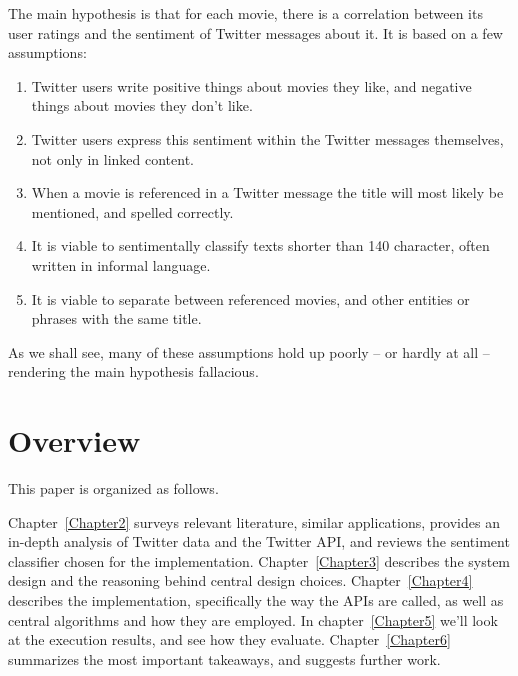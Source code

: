 The main hypothesis is that for each movie, there is a correlation between its user ratings and the sentiment of Twitter messages about it. It is based on a few assumptions:

\begin{enumerate}
  \item Twitter users write positive things about movies they like, and negative things about movies they don't like.
  \item Twitter users express this sentiment within the Twitter messages themselves, not only in linked content.
  \item When a movie is referenced in a Twitter message the title will most likely be mentioned, and spelled correctly.
  \item It is viable to sentimentally classify texts shorter than 140 character, often written in informal language.
  \item It is viable to separate between referenced movies, and other entities or phrases with the same title.
\end{enumerate}

As we shall see, many of these assumptions hold up poorly -- or hardly at all -- rendering the main hypothesis fallacious.


\section{Overview}

This paper is organized as follows.

Chapter~\ref{Chapter2} surveys relevant literature, similar applications, provides an in-depth analysis of Twitter data and the Twitter API, and reviews the sentiment classifier chosen for the implementation.
Chapter~\ref{Chapter3} describes the system design and the reasoning behind central design choices.
Chapter~\ref{Chapter4} describes the implementation, specifically the way the APIs are called, as well as central algorithms and how they are employed.
In chapter~\ref{Chapter5} we'll look at the execution results, and see how they evaluate.
Chapter~\ref{Chapter6} summarizes the most important takeaways, and suggests further work.

